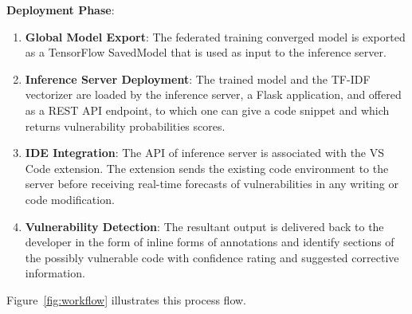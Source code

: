\documentclass[pdflatex,sn-mathphys-num]{sn-jnl}
\theoremstyle{thmstyleone}%
\theoremstyle{thmstyletwo}%
\theoremstyle{thmstylethree}%
\begin{document}
\textbf{Deployment Phase}:

\begin{enumerate}
    \item \textbf{Global Model Export}: The federated training converged model is exported as a TensorFlow SavedModel that is used as input to the inference server.
    
    \item \textbf{Inference Server Deployment}: The trained model and the TF-IDF vectorizer are loaded by the inference server, a Flask application, and offered as a REST API endpoint, to which one can give a code snippet and which returns vulnerability probabilities scores.
    
    \item \textbf{IDE Integration}: The API of inference server is associated with the VS Code extension. The extension sends the existing code environment to the server before receiving real-time forecasts of vulnerabilities in any writing or code modification.
    
    \item \textbf{Vulnerability Detection}: The resultant output is delivered back to the developer in the form of inline forms of annotations and identify sections of the possibly vulnerable code with confidence rating and suggested corrective information.
\end{enumerate}

Figure~\ref{fig:workflow} illustrates this process flow.
\end{document}
